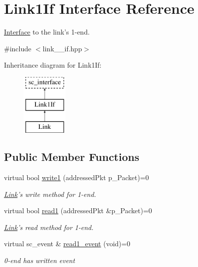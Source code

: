 \hypertarget{classLink1If}{\section{Link1\-If Interface Reference}
\label{classLink1If}
}


\hyperlink{classInterface}{Interface} to the link's 1-\/end.  




{\ttfamily \#include $<$link\-\_\-\_\-if.\-hpp$>$}

Inheritance diagram for Link1\-If\-:\begin{figure}[H]
\begin{center}
\leavevmode
\includegraphics[height=3.000000cm]{classLink1If}
\end{center}
\end{figure}
\subsection*{Public Member Functions}
\begin{DoxyCompactItemize}
\item 
virtual bool \hyperlink{classLink1If_ac0213a341d9809331509690a5c13b0ac}{write1} (addressed\-Pkt p\-\_\-\-Packet)=0
\begin{DoxyCompactList}\small\item\em \hyperlink{classLink}{Link}'s write method for 1-\/end. \end{DoxyCompactList}\item 
virtual bool \hyperlink{classLink1If_aed95671720ed114162dfa5b8ad8864c8}{read1} (addressed\-Pkt \&p\-\_\-\-Packet)=0
\begin{DoxyCompactList}\small\item\em \hyperlink{classLink}{Link}'s read method for 1-\/end. \end{DoxyCompactList}\item 
virtual sc\-\_\-event \& \hyperlink{classLink1If_a921db0c6c77ef9363aa5e6d880606c86}{read1\-\_\-event} (void)=0
\begin{DoxyCompactList}\small\item\em 0-\/end has written event \end{DoxyCompactList}\end{DoxyCompactItemize}


